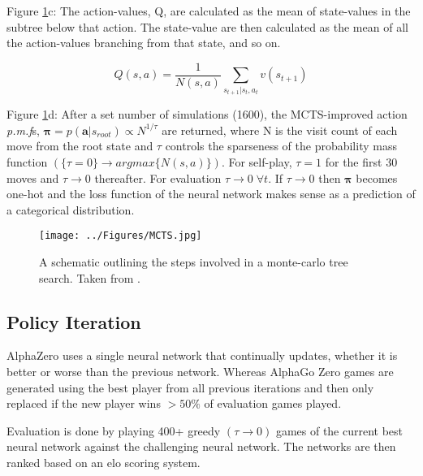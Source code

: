 \documentclass[main.tex]{subfiles}
\begin{document}
Figure \ref{fig:MCTS}c:
The action-values, Q, are calculated as the mean of state-values in the subtree below that action. The state-value are then calculated as the mean of all the action-values branching from that state, and so on.

\begin{equation}
   Q(s, a) = \frac{1}{N(s, a)} \sum_{s_{t+1} | s_t, a_t} v(s_{t+1})
   \label{eqn:actionvalue}
\end{equation} 

Figure \ref{fig:MCTS}d:
After a set number of simulations (1600), the MCTS-improved action \textit{p.m.f}s, $\boldsymbol{\pi} = p(\boldsymbol{a} | s_{root}) \propto N^{1/\tau}$ are returned, where N is the visit count of each move from the root state and $\tau$ controls the sparseness of the probability mass function $(\{\tau = 0\} \rightarrow argmax\{N(s, a)\})$. For self-play, $\tau = 1$ for the first 30 moves and $\tau \rightarrow 0$ thereafter. For evaluation $\tau \rightarrow 0 \; \forall t$. If $\tau \rightarrow 0$ then $\boldsymbol{\pi}$ becomes one-hot and the loss function of the neural network makes sense as a prediction of a categorical distribution.

\begin{figure}[H]
   \centering
   \texttt{[image: ../Figures/MCTS.jpg]}
   \caption{\label{fig:MCTS} A schematic outlining the steps involved in a monte-carlo tree search. Taken from \cite{AlphaGoZero}.}
\end{figure}

\subsection{Policy Iteration}

AlphaZero uses a single neural network that continually updates, whether it is better or worse than the previous network. Whereas AlphaGo Zero games are generated using the best player from all previous iterations and then only replaced if the new player wins $> 50\%$ of evaluation games played.

Evaluation is done by playing 400+ greedy $(\tau \rightarrow 0)$ games of the current best neural network against the challenging neural network. The networks are then ranked based on an elo scoring system. \\
\end{document}
